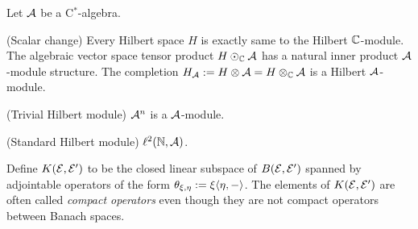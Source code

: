 \documentclass{../../small}
\begin{document}
\begin{ex}
Let $\cA$ be a C$^*$-algebra.
\begin{parts}
\item (Scalar change) Every Hilbert space $H$ is exactly same to the Hilbert $\mathbb{C}$-module. The algebraic vector space tensor product $H\odot_{\mathbb{C}}\mathcal{A}$ has a natural inner product $\cA$-module structure. The completion $H_{\mathcal{A}}:=H\otimes\mathcal{A}=H\otimes_{\mathbb{C}}\mathcal{A}$ is a Hilbert $\cA$-module.
\item (Trivial Hilbert module) $\mathcal{A}^n$ is a $\cA$-module.
\item (Standard Hilbert module) $\ell^2(\mathbb{N},\mathcal{A})$.
\end{parts}
\end{ex}

\iffalse
\begin{ex}[Basic constructions]
product, coproducts, pullbacks, pushouts, direct limits
complementations(sub,quo), tensor products........??
localization
\begin{parts}
\item a
\item (Localization) 
Let $\cA\subset\cB$ be C$^*$-algebras and let $1_\cB\in\cA$.
Let $\f:\cB\to\cA$ be a conditional expectation.
Suppose 
Let $\cE$ be a Hilbert $\cA$-mmodule.
\end{parts}
\end{ex}
\fi


\begin{defn}
Define $K(\mathcal{E},\mathcal{E}')$ to be the closed linear subspace of $B(\mathcal{E},\mathcal{E}')$ spanned by adjointable operators of the form $\theta_{\xi,\eta}:=\xi\langle\eta,-\rangle$.
The elements of $K(\mathcal{E},\mathcal{E}')$ are often called \emph{compact operators} even though they are not compact operators between Banach spaces.
\end{defn}
\end{document}
